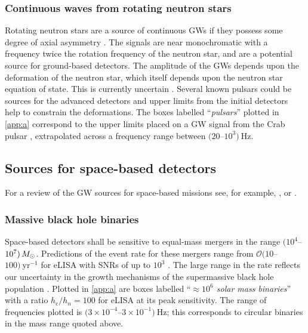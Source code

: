 \subsubsection{Continuous waves from rotating neutron stars}

Rotating neutron stars are a source of continuous GWs if they possess some degree of axial asymmetry \citep{Abbott2007, Prix2009, Einstein@Home}. The signals are near monochromatic with a frequency twice the rotation frequency of the neutron star, and are a potential source for ground-based detectors. The amplitude of the GWs depends upon the deformation of the neutron star, which itself depends upon the neutron star equation of state. This is currently uncertain \citep{Lattimer2012}. Several known pulsars could be sources for the advanced detectors and upper limits from the initial detectors help to constrain the deformations. The boxes labelled ``\emph{pulsars}'' plotted in \ref{app:a} correspond to the upper limits placed on a GW signal from the Crab pulsar \citep{Aasi2014a}, extrapolated across a frequency range between $(20$--$10^{3})~\mathrm{Hz}$.

\subsection{Sources for space-based detectors}

For a review of the GW sources for space-based missions see, for example, \citet{Amaro-Seoane-et-al}, \citet{Gairetal} or \citet{eLISAyellowbook}.


\subsubsection{Massive black hole binaries}

Space-based detectors shall be sensitive to equal-mass mergers in the range $(10^{4}$--$10^{7})\,M_{ \odot }$. Predictions of the event rate for these mergers range from ${\mathcal{O}}(10$--$100)~\mathrm{yr}^{-1}$ for eLISA with SNRs of up to $10^3$ \citep{TheGravitationalUniverse}. The large range in the rate reflects our uncertainty in the growth mechanisms of the supermassive black hole population \citep{Volonteri2010}. Plotted in \ref{app:a} are boxes labelled ``\emph{$\approx 10^{6}$ solar mass binaries}'' with a ratio $h_\mathrm{c}/h_{n}=100$ for eLISA at its peak sensitivity. The range of frequencies plotted is $(3\times 10^{-4}$--$3\times 10^{-1})~\mathrm{Hz}$; this corresponds to circular binaries in the mass range quoted above.

